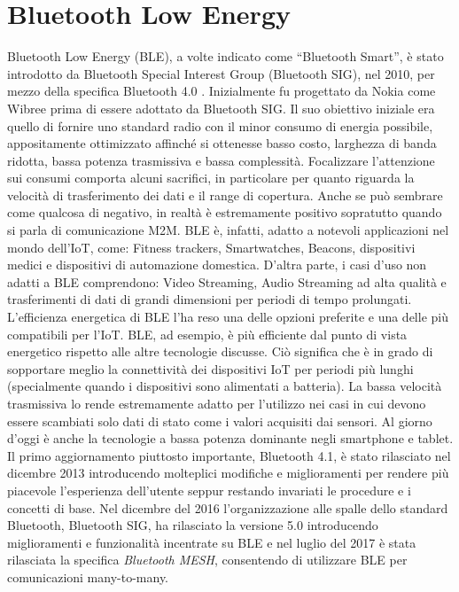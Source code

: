 \section{Bluetooth Low Energy}
Bluetooth Low Energy (BLE), a volte indicato come ``Bluetooth Smart'', è stato introdotto da Bluetooth Special Interest Group (Bluetooth  SIG), nel 2010, per mezzo della specifica Bluetooth 4.0 \cite{afaneh2018intro, townsend2014getting}. Inizialmente fu progettato da Nokia come Wibree prima di essere adottato da Bluetooth SIG. Il suo obiettivo iniziale era quello di fornire uno standard radio con il minor consumo di energia possibile, appositamente ottimizzato affinché si ottenesse basso costo, larghezza di banda ridotta, bassa potenza trasmissiva e bassa complessità. 
Focalizzare l'attenzione sui consumi comporta alcuni sacrifici, in particolare per quanto riguarda la velocità di trasferimento dei dati e il range di copertura. Anche se può sembrare come qualcosa di negativo, in realtà è estremamente positivo sopratutto quando si parla di comunicazione M2M. BLE è, infatti, adatto a notevoli applicazioni nel mondo dell'IoT, come: Fitness trackers, Smartwatches, Beacons, dispositivi medici e dispositivi di automazione domestica. D'altra parte, i casi d'uso non adatti a BLE comprendono: Video Streaming, Audio Streaming ad alta qualità e trasferimenti di dati di grandi dimensioni per periodi di tempo prolungati.\\

\noindent L'efficienza energetica di BLE l'ha reso una delle opzioni preferite e una delle più compatibili per l'IoT. BLE, ad esempio, è più efficiente dal punto di vista energetico rispetto alle altre tecnologie discusse. Ciò significa che è in grado di sopportare meglio la connettività dei dispositivi IoT per periodi più lunghi (specialmente quando i dispositivi sono alimentati a batteria). La bassa velocità trasmissiva lo rende estremamente adatto per l'utilizzo nei casi in cui devono essere scambiati solo dati di stato come i valori acquisiti dai sensori. Al giorno d'oggi è anche la tecnologie a bassa potenza dominante negli smartphone e tablet.\\

\noindent Il primo aggiornamento piuttosto importante, Bluetooth 4.1, è stato rilasciato nel dicembre 2013 introducendo molteplici modifiche e miglioramenti per rendere più piacevole l'esperienza dell'utente seppur restando invariati le procedure e i concetti di base. Nel dicembre del 2016 l'organizzazione alle spalle dello standard Bluetooth, Bluetooth SIG, ha rilasciato la versione 5.0 \cite{bluetooth2016specification} introducendo miglioramenti e funzionalità incentrate su BLE e nel luglio del 2017 è stata rilasciata la specifica \textit{Bluetooth MESH}, consentendo di utilizzare BLE per comunicazioni many-to-many.\\

